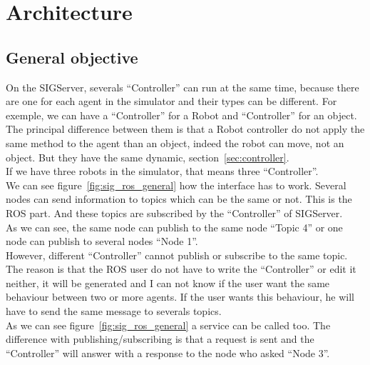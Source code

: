 \section{Architecture}
\subsection{General objective}
On the SIGServer, severals ``Controller'' can run at the same time, because there are one for each agent in the simulator and their types can be different. For exemple, we can have a ``Controller'' for a Robot and ``Controller'' for an object. The principal difference between them is that a Robot controller do not apply the same method to the agent than an object, indeed the robot can move, not an object. But they have the same dynamic, section~\ref{sec:controller}.\\
If we have three robots in the simulator, that means three ``Controller''.\\

We can see figure~\ref{fig:sig_ros_general} how the interface has to work. Several nodes can send information to topics which can be the same or not. This is the ROS part. And these topics are subscribed by the ``Controller'' of SIGServer.\\
As we can see, the same node can publish to the same node ``Topic 4'' or one node can publish to several nodes ``Node 1''.\\
However, different ``Controller'' cannot publish or subscribe to the same topic. The reason is that the ROS user do not have to write the ``Controller'' or edit it neither, it will be generated and I can not know if the user want the same behaviour between two or more agents. If the user wants this behaviour, he will have to send the same message to severals topics.\\

As we can see figure~\ref{fig:sig_ros_general} a service can be called too. The difference with publishing/subscribing is that a request is sent and the ``Controller'' will answer with a response to the node who asked ``Node 3''.

